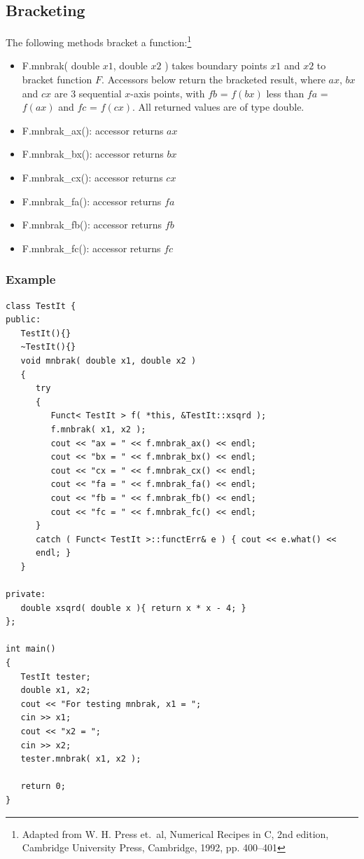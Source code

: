 \documentclass{report}
\begin{document}
\subsection{Bracketing}

The following methods bracket a function:\footnote{Adapted from W. H.
Press et.\ al, Numerical Recipes in C, 2nd edition, Cambridge
University Press, Cambridge, 1992, pp. 400--401}
\begin{itemize}
\item F.mnbrak( double $x1$, double $x2$ ) takes boundary points $x1$
and $x2$ to bracket function $F$.  Accessors below return the
bracketed result, where $ax$, $bx$ and $cx$ are 3 sequential $x$-axis
points, with $fb$ = $f(bx)$ less than $fa$ = $f(ax)$ and $fc$ =
$f(cx)$.  All returned values are of type double.
\item F.mnbrak\_ax(): accessor returns $ax$
\item F.mnbrak\_bx(): accessor returns $bx$
\item F.mnbrak\_cx(): accessor returns $cx$
\item F.mnbrak\_fa(): accessor returns $fa$
\item F.mnbrak\_fb(): accessor returns $fb$
\item F.mnbrak\_fc(): accessor returns $fc$
\end{itemize}

\subsubsection{Example}
\begin{verbatim}
class TestIt {
public:
   TestIt(){}
   ~TestIt(){}
   void mnbrak( double x1, double x2 )
   {
      try
      {
         Funct< TestIt > f( *this, &TestIt::xsqrd );
         f.mnbrak( x1, x2 );
         cout << "ax = " << f.mnbrak_ax() << endl;
         cout << "bx = " << f.mnbrak_bx() << endl;
         cout << "cx = " << f.mnbrak_cx() << endl;
         cout << "fa = " << f.mnbrak_fa() << endl;
         cout << "fb = " << f.mnbrak_fb() << endl;
         cout << "fc = " << f.mnbrak_fc() << endl;
      }
      catch ( Funct< TestIt >::functErr& e ) { cout << e.what() <<
      endl; }
   }

private:
   double xsqrd( double x ){ return x * x - 4; }
};

int main()
{
   TestIt tester;
   double x1, x2;
   cout << "For testing mnbrak, x1 = ";
   cin >> x1;
   cout << "x2 = ";
   cin >> x2;
   tester.mnbrak( x1, x2 );

   return 0;
}
\end{verbatim}
\end{document}
